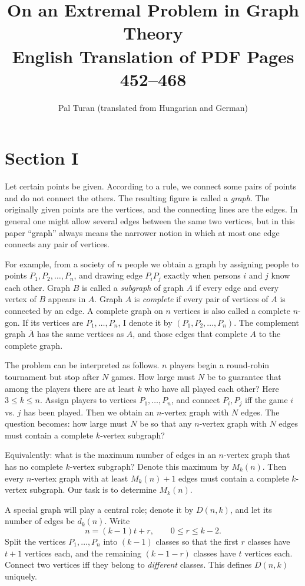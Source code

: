 \documentclass[11pt]{article}
\title{On an Extremal Problem in Graph Theory\\English Translation of PDF Pages 452--468}
\author{Pal Turan (translated from Hungarian and German)}
\date{}
\begin{document}
\maketitle

\section*{Section I}
Let certain points be given. According to a rule, we connect some pairs of points and do not connect the others. The resulting figure is called a \emph{graph}. The originally given points are the vertices, and the connecting lines are the edges. In general one might allow several edges between the same two vertices, but in this paper ``graph'' always means the narrower notion in which at most one edge connects any pair of vertices.

For example, from a society of $n$ people we obtain a graph by assigning people to points $P_1,P_2,\dots,P_n$, and drawing edge $P_iP_j$ exactly when persons $i$ and $j$ know each other. Graph $B$ is called a \emph{subgraph} of graph $A$ if every edge and every vertex of $B$ appears in $A$. Graph $A$ is \emph{complete} if every pair of vertices of $A$ is connected by an edge. A complete graph on $n$ vertices is also called a complete $n$-gon. If its vertices are $P_1,\dots,P_n$, I denote it by $(P_1,P_2,\dots,P_n)$. The complement graph $\bar A$ has the same vertices as $A$, and those edges that complete $A$ to the complete graph.

The problem can be interpreted as follows. $n$ players begin a round-robin tournament but stop after $N$ games. How large must $N$ be to guarantee that among the players there are at least $k$ who have all played each other? Here $3\le k\le n$. Assign players to vertices $P_1,\dots,P_n$, and connect $P_i,P_j$ iff the game $i$ vs. $j$ has been played. Then we obtain an $n$-vertex graph with $N$ edges. The question becomes: how large must $N$ be so that any $n$-vertex graph with $N$ edges must contain a complete $k$-vertex subgraph?

Equivalently: what is the maximum number of edges in an $n$-vertex graph that has no complete $k$-vertex subgraph? Denote this maximum by $M_k(n)$. Then every $n$-vertex graph with at least $M_k(n)+1$ edges must contain a complete $k$-vertex subgraph. Our task is to determine $M_k(n)$.

A special graph will play a central role; denote it by $D(n,k)$, and let its number of edges be $d_k(n)$. Write
\[
n=(k-1)t+r,\qquad 0\le r\le k-2.
\]
Split the vertices $P_1,\dots,P_n$ into $(k-1)$ classes so that the first $r$ classes have $t+1$ vertices each, and the remaining $(k-1-r)$ classes have $t$ vertices each. Connect two vertices iff they belong to \emph{different} classes. This defines $D(n,k)$ uniquely.
\end{document}
